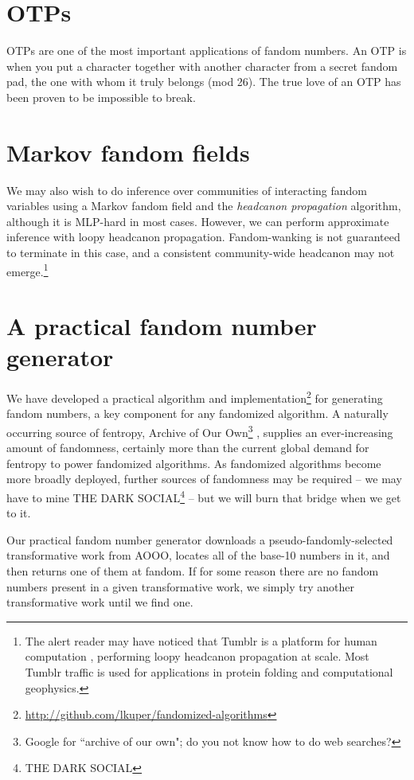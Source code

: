 \documentclass[9pt]{sigplanconf}
\begin{document}
\section{OTPs}
OTPs are one of the most important applications of fandom numbers.  An
OTP is when you put a character together with another character from a
secret fandom pad, the one with whom it truly belongs (mod 26).  The
true love of an OTP has been proven to be impossible to break.

\section{Markov fandom fields}
We may also wish to do inference over communities of interacting fandom
variables using a Markov fandom field and the \emph{headcanon propagation}
algorithm, although it is MLP-hard in most cases.  However, we can perform
approximate inference with loopy headcanon propagation.  Fandom-wanking is not
guaranteed to terminate in this case, and a consistent community-wide headcanon
may not emerge.\footnote{The alert reader may have noticed that Tumblr is a
platform for human computation \cite{luisvonahn}, performing loopy headcanon
propagation at scale. Most Tumblr traffic is used for applications in protein
folding and computational geophysics.}

\section{A practical fandom number generator}
We have developed a practical algorithm and implementation\footnote{
\url{http://github.com/lkuper/fandomized-algorithms}} for
generating fandom numbers, a key component for any fandomized
algorithm. A naturally occurring source of fentropy, Archive of Our
Own\footnote{Google for ``archive of our own"; do you not know how to
  do web searches?\footnotemark}
, supplies an
ever-increasing amount of fandomness, certainly more than the current
global demand for fentropy to power fandomized algorithms. As
fandomized algorithms become more broadly deployed, further sources of
fandomness may be required -- we may have to mine THE DARK
SOCIAL\footnote{THE DARK SOCIAL} -- but we will burn that bridge when
we get to it.

Our practical fandom number generator downloads a pseudo-fandomly-selected
transformative work from AOOO, locates all of the base-10 numbers in it, and
then returns one of them at fandom. If for some reason there are no fandom
numbers present in a given transformative work, we simply try another
transformative work until we find one.
\end{document}

